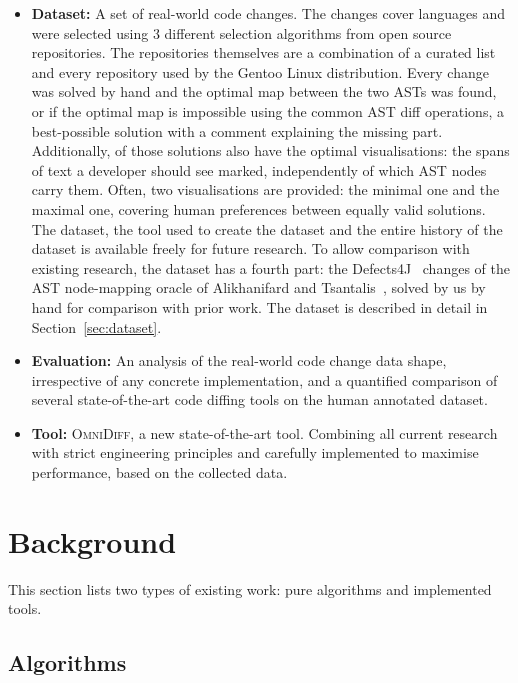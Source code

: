 \documentclass[sigconf]{acmart}
\begin{document}
\begin{itemize}
  \item \textbf{Dataset:} A set of \NumFixtures{} real-world code changes. The changes cover
    \NumFixtureLanguages{} languages and were selected using 3 different selection algorithms from
    \NumRepos{} open source repositories.
    The repositories themselves are a combination of a curated list and every repository used by the Gentoo
    Linux distribution. Every change was solved by hand and the optimal map between the two ASTs
    was found, or if the optimal map is impossible using the common AST diff operations, a best-possible
    solution with a comment explaining the missing part. Additionally, \PaintingFixtures{} of those
    solutions also have the optimal visualisations: the spans of text a developer should see marked,
    independently of which AST nodes carry them. Often, two visualisations are provided: the minimal one
    and the maximal one, covering human preferences between equally valid solutions.
    The dataset, the tool used to create the dataset and the entire history of the dataset is available
    freely for future research. To allow comparison with existing research, the dataset has a
    fourth part: the Defects4J~\cite{defects4j} changes of the AST node-mapping oracle of
    Alikhanifard and Tsantalis~\cite{astdiffbenchmark}, solved by us by hand for comparison with
    prior work. The dataset is described in detail in
    Section~\ref{sec:dataset}.
  \item \textbf{Evaluation:} An analysis of the real-world code change
    data shape, irrespective of any concrete implementation, and a quantified comparison of several
    state-of-the-art code diffing tools on the human annotated dataset.
  \item \textbf{Tool:} \textsc{OmniDiff}, a new state-of-the-art tool. Combining all current research
    with strict engineering principles and carefully implemented to maximise performance, based on
    the collected data.
\end{itemize}

\section{Background}
\label{sec:background}

This section lists two types of existing work: pure algorithms and implemented tools.

\subsection{Algorithms}
\end{document}
